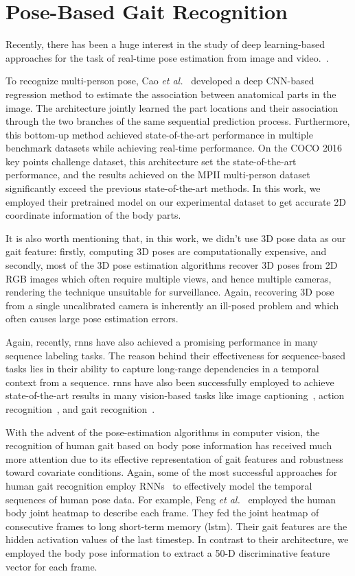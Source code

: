 \section{Pose-Based Gait Recognition} \label{sec:pose_based_gait_rec}
Recently, there has been a huge interest in the study of deep learning-based approaches for the task of real-time pose estimation from image and video.~\cite{Wei_16, Cao_19}.  

To recognize multi-person pose, Cao \textit{et al.}~\cite{Cao_19} developed a deep CNN-based regression method to estimate the association between anatomical parts in the image. The architecture jointly learned the part locations and their association through the two branches of the same sequential prediction process. Furthermore, this bottom-up method achieved state-of-the-art performance in multiple benchmark datasets while achieving real-time performance. On the COCO 2016 key points challenge dataset, this architecture set the state-of-the-art performance, and the results achieved on the MPII multi-person dataset~\cite{Cai_16} significantly exceed the previous state-of-the-art methods. In this work, we employed their pretrained model on our experimental dataset to get accurate 2D coordinate information of the body parts. 

It is also worth mentioning that, in this work, we didn't use 3D pose data as our gait feature: firstly, computing 3D poses are computationally expensive, and secondly, most of the 3D pose estimation algorithms recover 3D poses from 2D RGB images which often require multiple views, and hence multiple cameras, rendering the technique unsuitable for surveillance. Again, recovering 3D pose from a single uncalibrated camera is inherently an ill-posed problem and which often causes large pose estimation errors. 

Again, recently, \gls{rnn}s have also achieved a promising performance in many sequence labeling tasks. The reason behind their effectiveness for sequence-based tasks lies in their ability to capture long-range dependencies in a temporal context from a sequence. \gls{rnn}s have also been successfully employed to achieve state-of-the-art results in many vision-based tasks like image captioning~\cite{Mao_15}, action recognition~\cite{Song_17, Du_15}, and gait recognition~\cite{Feng_16, Liao_17}.

With the advent of the pose-estimation algorithms in computer vision, the recognition of human gait based on body pose information has received much more attention due to its effective representation of gait features and robustness toward covariate conditions. Again, some of the most successful approaches for human gait recognition employ RNNs~\cite{Feng_16, Liao_17, Liao_19} to effectively model the temporal sequences of human pose data. For example, Feng \textit{et al.}~\cite{Feng_16} employed the human body joint heatmap to describe each frame. They fed the joint heatmap of consecutive frames to long short-term memory (\gls{lstm}). Their gait features are the hidden activation values of the last timestep. In contrast to their architecture, we employed the body pose information to extract a 50-D discriminative feature vector for each frame. 


